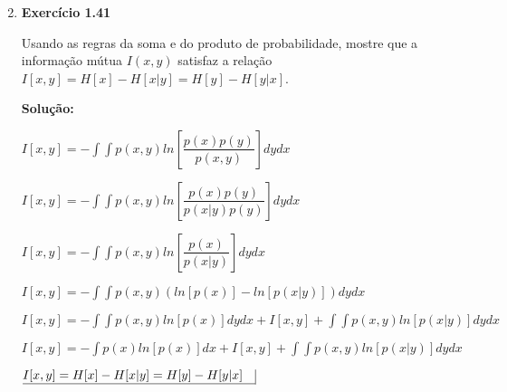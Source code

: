 \begin{enumerate}
\begin{enumerate}
    $ $
    
\end{enumerate}



\item \textbf{Exercício 1.41} \par

Usando as regras da soma e do produto de probabilidade, mostre que a informação mútua $I(x, y)$ satisfaz a relação $I[x,y]=H[x]-H[x|y]=H[y]-H[y|x]$.
\newline \par
\textbf{Solução:}


$I[x,y] = \displaystyle - \int \int p(x,y) ln\left[ \dfrac{p(x)p(y)}{p(x,y)}  \right] dy dx $

$I[x,y] = \displaystyle - \int \int p(x,y) ln\left[ \dfrac{p(x)p(y)}{p(x|y)p(y)}  \right] dy dx $ 

$I[x,y] = \displaystyle - \int \int p(x,y) ln\left[ \dfrac{p(x)}{p(x|y)}  \right] dy dx $

$I[x,y] = \displaystyle - \int \int p(x,y) \left( ln[p(x)] - ln[p(x|y)] \right) dy dx $

$I[x,y] = \displaystyle - \int \int p(x,y) ln[p(x)] dy dx + I[x,y] + \int \int p(x,y) ln[p(x|y)] dy dx $

$I[x,y] = \displaystyle - \int p(x) ln[p(x)] dx + I[x,y] + \int \int p(x,y) ln[p(x|y)] dy dx $

$\underline{I[x,y]=H[x]-H[x|y]=H[y]-H[y|x] \quad} \vline$













\end{enumerate}